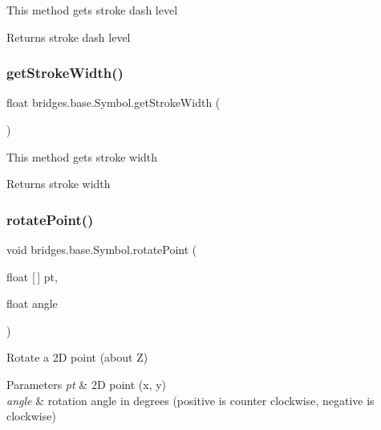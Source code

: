 This method gets stroke dash level

\begin{DoxyReturn}{Returns}
stroke dash level 
\end{DoxyReturn}
\mbox{\label{classbridges_1_1base_1_1_symbol_a9c79f84ba764b7683c99c5deb1f5a191}} 
\subsubsection{\texorpdfstring{get\+Stroke\+Width()}{getStrokeWidth()}}
{\footnotesize\ttfamily float bridges.\+base.\+Symbol.\+get\+Stroke\+Width (\begin{DoxyParamCaption}{ }\end{DoxyParamCaption})}

This method gets stroke width

\begin{DoxyReturn}{Returns}
stroke width 
\end{DoxyReturn}
\mbox{\label{classbridges_1_1base_1_1_symbol_affed9d5b28b0643d3b94d3fb3c7b6858}} 
\subsubsection{\texorpdfstring{rotate\+Point()}{rotatePoint()}}
{\footnotesize\ttfamily void bridges.\+base.\+Symbol.\+rotate\+Point (\begin{DoxyParamCaption}\item[{float \mbox{[}$\,$\mbox{]}}]{pt,  }\item[{float}]{angle }\end{DoxyParamCaption})\hspace{0.3cm}{\ttfamily [protected]}}



Rotate a 2D point (about Z) 


\begin{DoxyParams}{Parameters}
{\em pt} & 2D point (x, y) \\
\hline
{\em angle} & rotation angle in degrees (positive is counter clockwise, negative is clockwise) \\
\hline
\end{DoxyParams}
\mbox{\label{classbridges_1_1base_1_1_symbol_a17d2845ca2742971f977cc5be847b786}} 
